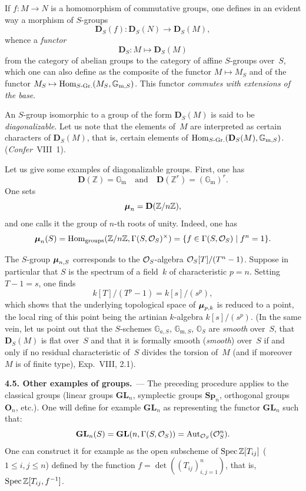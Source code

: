 If \(f \colon M \to N\) is a homomorphism of commutative groups, one defines in an evident way a morphism of \(S\)-groups
\[
\mathbf{D}_S(f) \colon \mathbf{D}_S(N) \longrightarrow \mathbf{D}_S(M),
\]
whence a \emph{functor}
\[
\mathbf{D}_S \colon M \mapsto \mathbf{D}_S(M)
\]
from the category of abelian groups to the category of affine \(S\)-groups over~\(S\), which one can also define as the composite of the functor \(M \mapsto M_S\) and of the functor \(M_S \mapsto \operatorname{Hom}_{S\text{-Gr.}}(M_S, \mathbb{G}_{\mathrm{m},S})\). This functor \emph{commutes with extensions of the base}.

An \(S\)-group isomorphic to a group of the form \(\mathbf{D}_S(M)\) is said to be \emph{diagonalizable}. Let us note that the elements of~\(M\) are interpreted as certain characters of \(\mathbf{D}_S(M)\), that is, certain elements of \(\operatorname{Hom}_{S\text{-Gr.}}(\mathbf{D}_S(M), \mathbb{G}_{\mathrm{m},S})\). (\emph{Confer}~VIII~1).

Let us give some examples of diagonalizable groups. First, one has
\[
\mathbf{D}(\mathbb{Z}) = \mathbb{G}_{\mathrm{m}} \quad\text{and}\quad \mathbf{D}(\mathbb{Z}^{r}) = (\mathbb{G}_{\mathrm{m}})^{r}.
\]
One sets
\[
\boldsymbol{\mu}_n = \mathbf{D}(\mathbb{Z}/n\mathbb{Z}),
\]
and one calls it the group of \(n\)-th roots of unity. Indeed, one has
\[
\boldsymbol{\mu}_n(S) = \operatorname{Hom}_{\mathrm{groups}}(\mathbb{Z}/n\mathbb{Z}, \Gamma(S, \mathcal{O}_S)^{\times}) = \{f \in \Gamma(S, \mathcal{O}_S) \mid f^{n} = 1\}.
\]

The \(S\)-group \(\boldsymbol{\mu}_{n,S}\) corresponds to the \(\mathcal{O}_S\)-algebra \(\mathcal{O}_S[T]/(T^{n} - 1)\). Suppose in particular that \(S\) is the spectrum of a field~\(k\) of characteristic \(p = n\). Setting \(T - 1 = s\), one finds
\[
k[T]/(T^{p} - 1) = k[s]/(s^{p}),
\]
which shows that the underlying topological space of \(\boldsymbol{\mu}_{p,k}\) is reduced to a point, the local ring of this point being the artinian \(k\)-algebra \(k[s]/(s^{p})\). (In the same vein, let us point out that the \(S\)-schemes \(\mathbb{G}_{a,S}\), \(\mathbb{G}_{\mathrm{m},S}\), \(\mathbb{O}_S\) are \emph{smooth} over~\(S\), that \(\mathbf{D}_S(M)\) is flat over~\(S\) and that it is formally smooth (\resp \emph{smooth}) over~\(S\) if and only if no residual characteristic of~\(S\) divides the torsion of~\(M\) (\resp and if moreover \(M\) is of finite type), \cf Exp.~VIII, 2.1).

\par{}
\noindent\textbf{4.5. Other examples of groups.}\label{I.sec.4.5}\ ---
The preceding procedure applies to the \og classical groups\fg{} (linear groups \(\mathbf{GL}_n\), symplectic groups \(\mathbf{Sp}_n\), orthogonal groups \(\mathbf{O}_n\), etc.). One will define for example \(\mathbf{GL}_n\) as representing the functor \(\mathbf{GL}_n\) such that:
\[
\mathbf{GL}_n(S) = \mathbf{GL}(n, \Gamma(S, \mathcal{O}_S)) = \operatorname{Aut}_{\mathcal{O}_S}(\mathcal{O}_S^{n}).
\]
One can construct it for example as the open subscheme of \(\operatorname{Spec} \mathbb{Z}[T_{ij}]\) (\(1 \leqslant i, j \leqslant n\)) defined by the function \(f = \det((T_{ij})_{i,j=1}^{n})\), that is, \(\operatorname{Spec} \mathbb{Z}[T_{ij}, f^{-1}]\).

